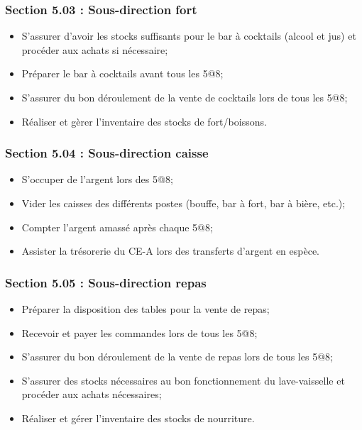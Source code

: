 \subsubsection*{Section 5.03 : Sous-direction fort}
\begin{itemize}
\item S’assurer d’avoir les stocks suffisants pour le bar à cocktails (alcool et jus) et procéder aux achats si nécessaire;
\item Préparer le bar à cocktails avant tous les 5@8;
\item S’assurer du bon déroulement de la vente de cocktails lors de tous les 5@8;
\item Réaliser et gèrer l’inventaire des stocks de fort/boissons.
\end{itemize}

\subsubsection*{Section 5.04 : Sous-direction caisse}
\begin{itemize}
\item S'occuper de l'argent lors des 5@8;
\item Vider les caisses des différents postes (bouffe, bar à fort, bar à bière, etc.);
\item Compter l'argent amassé après chaque 5@8;
\item Assister la trésorerie du CE-A lors des transferts d’argent en espèce.
\end{itemize}

\subsubsection*{Section 5.05 : Sous-direction repas}
\begin{itemize}
\item Préparer la disposition des tables pour la vente de repas;
\item Recevoir et payer les commandes lors de tous les 5@8;
\item S’assurer du bon déroulement de la vente de repas lors de tous les 5@8;
\item S’assurer des stocks nécessaires au bon fonctionnement du lave-vaisselle et procéder aux achats nécessaires;
\item Réaliser et gérer l’inventaire des stocks de nourriture.
\end{itemize}


